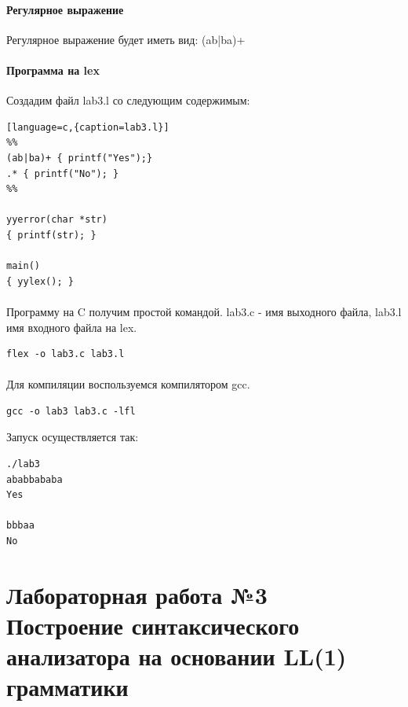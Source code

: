 \documentclass[a4paper,12pt]{article}
\begin{document}
\paragraph{Регулярное выражение}
Регулярное выражение будет иметь вид: (ab|ba)+

\paragraph{Программа на lex}
Создадим файл lab3.l со следующим содержимым:

\begin{lstlisting}[language=c,{caption=lab3.l}]
%%
(ab|ba)+ { printf("Yes");}
.* { printf("No"); }
%%

yyerror(char *str)
{ printf(str); }

main()
{ yylex(); }
\end{lstlisting}

\paragraph{}
Программу на C получим простой командой. lab3.c - имя выходного файла, lab3.l имя входного файла на lex.

\begin{verbatim}
flex -o lab3.c lab3.l
\end{verbatim}

\paragraph{}
Для компиляции воспользуемся компилятором gcc.
\begin{verbatim}
gcc -o lab3 lab3.c -lfl
\end{verbatim}

Запуск осуществляется так:
\begin{verbatim}
./lab3
ababbababa
Yes

bbbaa
No	
\end{verbatim}

\newpage

\section{Лабораторная работа №3\\
	Построение синтаксического анализатора на основании LL(1) грамматики}
\end{document}
